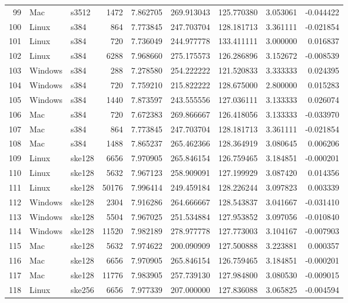 \documentclass{IEEEtran}
\begin{document}
\begin{longtable}{rllrrrrrr}
  99 & Mac & s3512 &    1472 & 7.862705 & 269.913043 & 125.770380 & 3.053061 & -0.044422 \\ 
  100 & Linux & s384 &     864 & 7.773845 & 247.703704 & 128.181713 & 3.361111 & -0.021854 \\ 
  101 & Linux & s384 &     720 & 7.736049 & 244.977778 & 133.411111 & 3.000000 & 0.016837 \\ 
  102 & Linux & s384 &    6288 & 7.968660 & 275.175573 & 126.286896 & 3.152672 & -0.008539 \\ 
  103 & Windows & s384 &     288 & 7.278580 & 254.222222 & 121.520833 & 3.333333 & 0.024395 \\ 
  104 & Windows & s384 &     720 & 7.759210 & 215.822222 & 128.675000 & 2.800000 & 0.015283 \\ 
  105 & Windows & s384 &    1440 & 7.873597 & 243.555556 & 127.036111 & 3.133333 & 0.026074 \\ 
  106 & Mac & s384 &     720 & 7.672383 & 269.866667 & 126.418056 & 3.133333 & -0.033970 \\ 
  107 & Mac & s384 &     864 & 7.773845 & 247.703704 & 128.181713 & 3.361111 & -0.021854 \\ 
  108 & Mac & s384 &    1488 & 7.865237 & 265.462366 & 128.364919 & 3.080645 & 0.006206 \\ 
  109 & Linux & ske128 &    6656 & 7.970905 & 265.846154 & 126.759465 & 3.184851 & -0.000201 \\ 
  110 & Linux & ske128 &    5632 & 7.967123 & 258.909091 & 127.199929 & 3.087420 & 0.014356 \\ 
  111 & Linux & ske128 &   50176 & 7.996414 & 249.459184 & 128.226244 & 3.097823 & 0.003339 \\ 
  112 & Windows & ske128 &    2304 & 7.916286 & 264.666667 & 128.543837 & 3.041667 & -0.031410 \\ 
  113 & Windows & ske128 &    5504 & 7.967025 & 251.534884 & 127.953852 & 3.097056 & -0.010840 \\ 
  114 & Windows & ske128 &   11520 & 7.982189 & 278.977778 & 127.773003 & 3.104167 & -0.007903 \\ 
  115 & Mac & ske128 &    5632 & 7.974622 & 200.090909 & 127.500888 & 3.223881 & 0.000357 \\ 
  116 & Mac & ske128 &    6656 & 7.970905 & 265.846154 & 126.759465 & 3.184851 & -0.000201 \\ 
  117 & Mac & ske128 &   11776 & 7.983905 & 257.739130 & 127.984800 & 3.080530 & -0.009015 \\ 
  118 & Linux & ske256 &    6656 & 7.977339 & 207.000000 & 127.836088 & 3.065825 & -0.004594 \\ 

\end{longtable}
\end{document}
